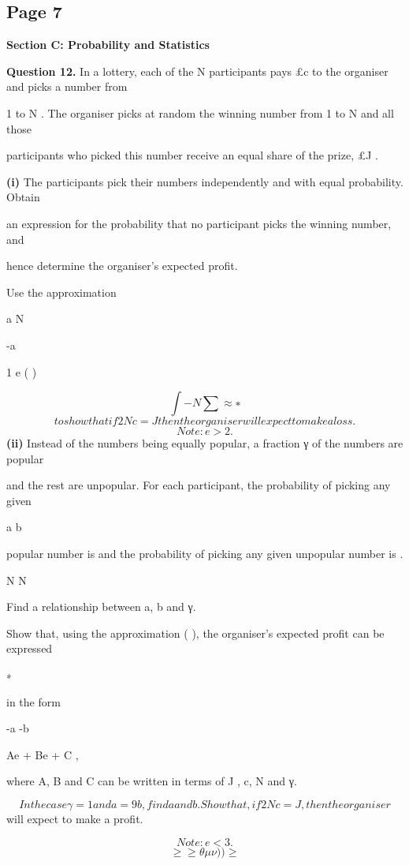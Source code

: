 \documentclass[12pt]{article}
\begin{document}
\subsection*{Page 7}
\begin{flushleft}
\bigskip\textbf{Section C: Probability and Statistics}\par
\bigskip\textbf{Question 12.} In a lottery, each of the N participants pays \pounds c to the organiser and picks a number from\par
1 to N . The organiser picks at random the winning number from 1 to N and all those\par
participants who picked this number receive an equal share of the prize, \pounds J .\par
\textbf{(i)} The participants pick their numbers independently and with equal probability. Obtain\par
an expression for the probability that no participant picks the winning number, and\par
hence determine the organiser's expected profit.\par
Use the approximation\par
a N\par
-a\par
1 e ( )\par
\[\int - N \sum \approx ∗\]
\[to show that if 2N c = J then the organiser will expect to make a loss.\]
\[Note: e > 2.\]
\textbf{(ii)} Instead of the numbers being equally popular, a fraction γ of the numbers are popular\par
and the rest are unpopular. For each participant, the probability of picking any given\par
a b\par
popular number is and the probability of picking any given unpopular number is .\par
N N\par
Find a relationship between a, b and γ.\par
Show that, using the approximation ( ), the organiser's expected profit can be expressed\par
∗\par
in the form\par
-a -b\par
Ae + Be + C ,\par
where A, B and C can be written in terms of J , c, N and γ.\par
\[In the case γ = 1 and a = 9b, find a and b. Show that, if 2N c = J , then the organiser\]
will expect to make a profit.\par
\[Note: e < 3.\]
\[\geq\geq\theta\mu\nu) ) \geq\]
\end{flushleft}
\end{document}
